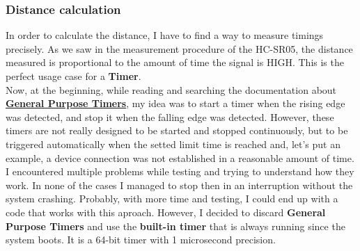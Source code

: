 \documentclass[14pt]{article}
\begin{document}
\begin{normalsize}
		\subsubsection*{\large Distance calculation}
		\label{dist_calc}
		In order to calculate the distance, I have to find a way to measure timings precisely. As we saw in the measurement procedure of the HC-SR05, the distance measured is proportional to the amount of time the signal is HIGH. This is the perfect usage case for a \textbf{Timer}.\\
		
		Now, at the beginning, while reading and searching the documentation about \href{https://docs.espressif.com/projects/esp-idf/en/v4.3/esp32/api-reference/peripherals/timer.html#timer-api-interrupts}{\textbf{General Purpose Timers}}, my idea was to start a timer when the rising edge was detected, and stop it when the falling edge was detected. However, these timers are not really designed to be started and stopped continuously, but to be triggered automatically when the setted limit time is reached and, let's put an example, a device connection was not established in a reasonable amount of time.\\
		
		I encountered multiple problems while testing and trying to understand how they work. In none of the cases I managed to stop then in an interruption without the system crashing. Probably, with more time and testing, I could end up with a code that works with this aproach. However, I decided to discard \textbf{General Purpose Timers} and use the \textbf{built-in timer} that is always running since the system boots. It is a 64-bit timer with 1 microsecond precision.\\
		

\end{normalsize}
\end{document}

